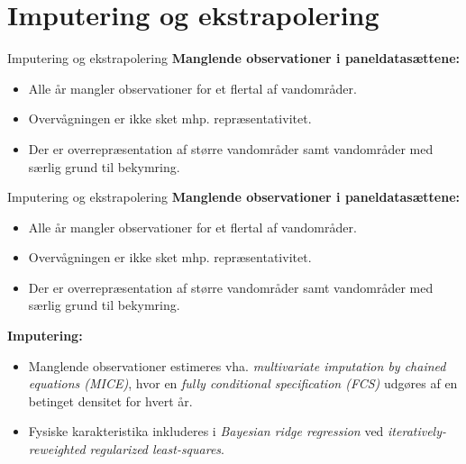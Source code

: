 \section{Imputering og ekstrapolering}

\begin{frame}{Imputering og ekstrapolering}
    \textbf{Manglende observationer i paneldatasættene:}
    \begin{itemize}
      \item Alle år mangler observationer for et flertal af vandområder.
      \item Overvågningen er ikke sket mhp. repræsentativitet.
      \item Der er overrepræsentation af større vandområder samt vandområder med særlig grund til bekymring.
    \end{itemize}
    \vfill
\end{frame}
\begin{frame}{Imputering og ekstrapolering}
  \textbf{Manglende observationer i paneldatasættene:}
  \begin{itemize}
    \item Alle år mangler observationer for et flertal af vandområder.
    \item Overvågningen er ikke sket mhp. repræsentativitet.
    \item Der er overrepræsentation af større vandområder samt vandområder med særlig grund til bekymring.
  \end{itemize}
  \textbf{Imputering:}
  \begin{itemize}
    \item Manglende observationer estimeres vha. \textit{multivariate imputation by chained equations (MICE)}, hvor en \textit{fully conditional specification (FCS)} udgøres af en betinget densitet for hvert år.
    \item Fysiske karakteristika inkluderes i \textit{Bayesian ridge regression} ved \textit{iteratively-reweighted regularized least-squares}.
  \end{itemize}
  \vfill
\end{frame}
